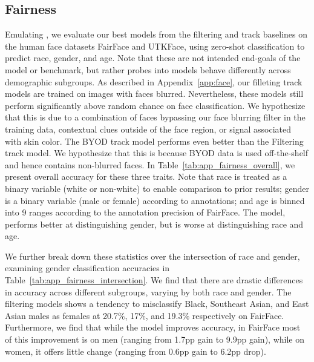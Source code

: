 \subsection{Fairness}

Emulating \citet{radford2021learning}, we evaluate our best models from the filtering and \byod track baselines on the human face datasets FairFace and UTKFace, using zero-shot classification to predict race, gender, and age. Note that these are not intended end-goals of the model or benchmark, but rather probes into models behave differently across demographic subgroups. As described in Appendix~\ref{app:face}, our filleting track models are trained on images with faces blurred.
Nevertheless, these models still perform significantly above random chance on face classification. We hypothesize that this is due to a combination of faces bypassing our face blurring filter in the training data, contextual clues outside of the face region, or signal associated with skin color.
The BYOD track model performs even better than the Filtering track model. We hypothesize that this is because BYOD data is used off-the-shelf and hence contains non-blurred faces.
In Table~\ref{tab:app_fairness_overall}, we present overall accuracy for these three traits. Note that race is treated as a binary variable (white or non-white) to enable comparison to prior results; gender is a binary variable (male or female) according to annotations; and age is binned into 9 ranges according to the annotation precision of FairFace. The \byod model, performs better at distinguishing gender, but is worse at distinguishing race and age.

We further break down these statistics over the intersection of race and gender, examining gender classification accuracies in Table~\ref{tab:app_fairness_intersection}. We find that there are drastic differences in accuracy across different subgroups, varying by both race and gender. The filtering models shows a tendency to misclassify Black, Southeast Asian, and East Asian males as females at 20.7\%, 17\%, and 19.3\% respectively on FairFace. Furthermore, we find that while the \byod model improves accuracy, in FairFace most of this improvement is on men (ranging from 1.7pp gain to 9.9pp gain), while on women, it offers little change (ranging from 0.6pp gain to 6.2pp drop).

